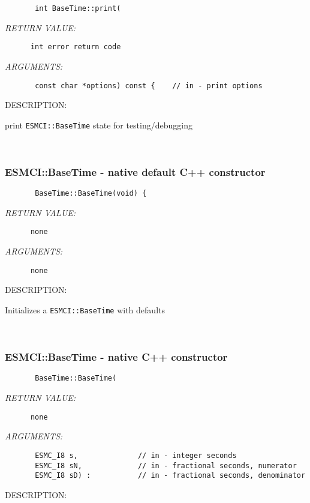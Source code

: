   
\begin{verbatim}       int BaseTime::print(\end{verbatim}{\em RETURN VALUE:}
\begin{verbatim}      int error return code\end{verbatim}{\em ARGUMENTS:}
\begin{verbatim}       const char *options) const {    // in - print options\end{verbatim}
{\sf DESCRIPTION:\\ }


        print {\tt ESMCI::BaseTime} state for testing/debugging
   
 
\mbox{}\hrulefill\ 
 
\subsubsection [ESMCI::BaseTime] {ESMCI::BaseTime - native default C++ constructor}


  
\begin{verbatim}       BaseTime::BaseTime(void) {\end{verbatim}{\em RETURN VALUE:}
\begin{verbatim}      none\end{verbatim}{\em ARGUMENTS:}
\begin{verbatim}      none\end{verbatim}
{\sf DESCRIPTION:\\ }


        Initializes a {\tt ESMCI::BaseTime} with defaults
   
 
\mbox{}\hrulefill\ 
 
\subsubsection [ESMCI::BaseTime] {ESMCI::BaseTime - native C++ constructor}


  
\begin{verbatim}       BaseTime::BaseTime(\end{verbatim}{\em RETURN VALUE:}
\begin{verbatim}      none\end{verbatim}{\em ARGUMENTS:}
\begin{verbatim}       ESMC_I8 s,              // in - integer seconds
       ESMC_I8 sN,             // in - fractional seconds, numerator
       ESMC_I8 sD) :           // in - fractional seconds, denominator\end{verbatim}
{\sf DESCRIPTION:\\ }


